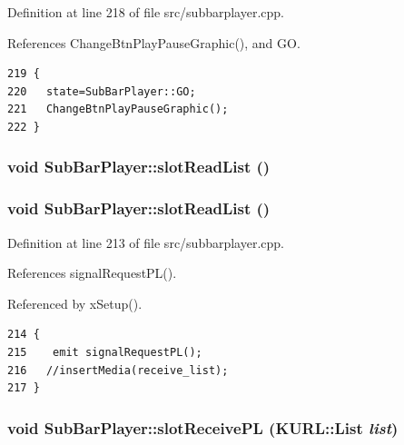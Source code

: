Definition at line 218 of file src/subbarplayer.cpp.

References Change\-Btn\-Play\-Pause\-Graphic(), and GO.



\footnotesize\begin{verbatim}219 {
220   state=SubBarPlayer::GO;
221   ChangeBtnPlayPauseGraphic();
222 }
\end{verbatim}\normalsize 
{}
\subsubsection{\setlength{\rightskip}{0pt plus 5cm}void Sub\-Bar\-Player::slot\-Read\-List ()\hspace{0.3cm}{\tt  [slot]}}\label{classSubBarPlayer_SubBarPlayeri34}


\subsubsection{\setlength{\rightskip}{0pt plus 5cm}void Sub\-Bar\-Player::slot\-Read\-List ()\hspace{0.3cm}{\tt  [slot]}}\label{classSubBarPlayer_SubBarPlayeri16}




Definition at line 213 of file src/subbarplayer.cpp.

References signal\-Request\-PL().

Referenced by x\-Setup().



\footnotesize\begin{verbatim}214 {
215    emit signalRequestPL();
216   //insertMedia(receive_list);
217 }
\end{verbatim}\normalsize 
{}
\subsubsection{\setlength{\rightskip}{0pt plus 5cm}void Sub\-Bar\-Player::slot\-Receive\-PL (KURL::List {\em list})\hspace{0.3cm}{\tt  [slot]}}\label{classSubBarPlayer_SubBarPlayeri33}


